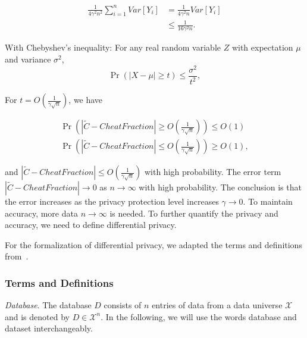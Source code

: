 \begin{equation}
    \begin{split}
        \frac{1}{4\gamma^{2}n^{2}}\sum ^{n}_{i=1}Var\left[ Y_{i}\right] &= \frac{1}{4\gamma^{2}n} Var\left[ Y_{i}\right] \\
        & \leq \frac{1}{16\gamma^{2}n}.
    \end{split}
\end{equation}


With Chebyshev's inequality: For any real random variable $Z$ with expectation $\mu$ and variance $\sigma^{2}$,
\begin{equation}
    \Pr( \left| X-\mu\right| \geq  t) \leq \frac{\sigma^{2}}{t^{2}},
\end{equation}

For $t=O\left(\frac{1}{\gamma\sqrt{n}}\right) $, we have

\begin{equation}
    \begin{split}
        \Pr \left(\left| \tilde{C}-CheatFraction\right| \geq O\left( \frac{1}{\gamma\sqrt{n}}\right)\right) \leq O\left(1\right) \\
        \Pr \left(\left| \tilde{C}-CheatFraction\right| \leq O\left( \frac{1}{\gamma\sqrt{n}}\right)\right) \geq O\left(1\right) ,
    \end{split}
\end{equation}

and $\left| \tilde{C}-CheatFraction\right| \leq O\left( \frac{1}{\gamma\sqrt{n}}\right)$ with high probability.
The error term $\left| \tilde{C}-CheatFraction\right| \to 0$ as $n \to \infty$ with high probability.
The conclusion is that the error increases as the privacy protection level increases $\gamma \to 0$. To maintain accuracy, more data $n \to \infty$ is needed. To further quantify the privacy and accuracy, we need to define differential privacy.



For the formalization of differential privacy, we adapted the terms and definitions from~\cite{dwork2014algorithmic}.

\subsubsection{Terms and Definitions}

\emph{Database}. The database $D$ consists of $n$ entries of data from a data universe $\mathcal{X}$ and is denoted by $D\in \mathcal{X}^{n}$. In the following, we will use the words database and dataset interchangeably.

